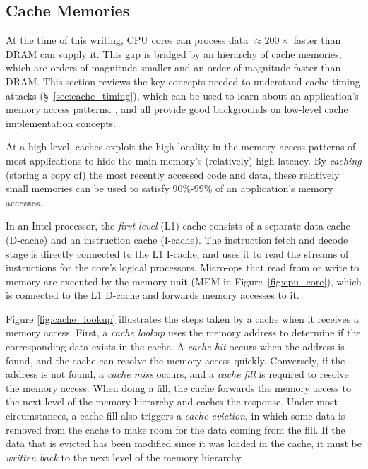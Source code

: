 \subsection{Cache Memories}
\label{sec:caching}

At the time of this writing, CPU cores can process data $\approx 200\times$
faster than DRAM can supply it. This gap is bridged by an hierarchy of cache
memories, which are orders of magnitude smaller and an order of magnitude
faster than DRAM. This section reviews the key concepts needed to understand
cache timing attacks (\S~\ref{sec:cache_timing}), which can be used to
learn about an application's memory access patterns. \cite{smith1982cache},
\cite{patterson2013architecture} and \cite{hennessy2012architecture} all
provide good backgrounds on low-level cache implementation concepts.

At a high level, caches exploit the high locality in the memory access patterns
of most applications to hide the main memory's (relatively) high latency. By
\textit{caching} (storing a copy of) the most recently accessed code and data,
these relatively small memories can be used to satisfy 90\%-99\% of an
application's memory accesses.

In an Intel processor, the \textit{first-level} (L1) cache consists of a
separate data cache (D-cache) and an instruction cache (I-cache). The
instruction fetch and decode stage is directly connected to the L1 I-cache, and
uses it to read the streams of instructions for the core's logical processors.
Micro-ops that read from or write to memory are executed by the memory unit
(MEM in Figure~\ref{fig:cpu_core}), which is connected to the L1 D-cache and
forwards memory accesses to it.

Figure \ref{fig:cache_lookup} illustrates the steps taken by a cache when it
receives a memory access. First, a \textit{cache lookup} uses the memory
address to determine if the corresponding data exists in the cache. A
\textit{cache hit} occurs when the address is found, and the cache can resolve
the memory access quickly. Conversely, if the address is not found, a
\textit{cache miss} occurs, and a \textit{cache fill} is required to resolve
the memory access. When doing a fill, the cache forwards the memory access to
the next level of the memory hierarchy and caches the response. Under most
circumstances, a cache fill also triggers a \textit{cache eviction}, in which
some data is removed from the cache to make room for the data coming from the
fill. If the data that is evicted has been modified since it was loaded in the
cache, it must be \textit{written back} to the next level of the memory
hierarchy.

